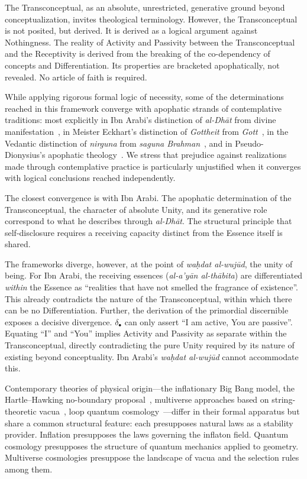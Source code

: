 \documentclass[11pt, a4paper]{article}
\theoremstyle{formalism}
\begin{document}
The Transconceptual, as an absolute, unrestricted, generative ground beyond
conceptualization, invites theological terminology. However, the
Transconceptual is not posited, but derived. It is derived as a logical
argument against Nothingness. The reality of Activity and Passivity between the
Transconceptual and the Receptivity is derived from the breaking of the
co-dependency of concepts and Differentiation. Its properties are bracketed
apophatically, not revealed. No article of faith is required.

While applying rigorous formal logic of necessity, some of the determinations
reached in this framework converge with apophatic strands of
contemplative traditions: most explicitly in Ibn Arabi's distinction of
\textit{al-Dh\=at} from divine manifestation~\cite{IbnArabi1203}, in Meister
Eckhart's distinction of \textit{Gottheit} from
\textit{Gott}~\cite{Eckhart1300}, in the Vedantic distinction of
\textit{nirguna} from \textit{saguna Brahman}~\cite{Shankara800}, and in
Pseudo-Dionysius's apophatic theology~\cite{PseudoDionysius500}. We stress that
prejudice against realizations made through contemplative practice is
particularly unjustified when it converges with logical conclusions reached
independently.

The closest convergence is with Ibn Arabi. The apophatic determination of the
Transconceptual, the character of absolute Unity, and its generative role
correspond to what he describes through \textit{al-Dh\=at}. The structural
principle that self-disclosure requires a receiving capacity distinct from
the Essence itself is shared.

The frameworks diverge, however, at the point of \textit{wa\d{h}dat
al-wuj\=ud}, the unity of being. For Ibn Arabi, the receiving essences
(\textit{al-a'y\=an al-th\=abita}) are differentiated \textit{within} the
Essence as ``realities that have not smelled the fragrance of existence''.
This already contradicts the nature of the Transconceptual, within which
there can be no Differentiation. Further, the derivation of the primordial
discernible exposes a decisive divergence. $\delta_\bullet$ can only assert
``I am active, You are passive''. Equating ``I'' and ``You'' implies Activity
and Passivity as separate within the Transconceptual, directly contradicting
the pure Unity required by its nature of existing beyond conceptuality. Ibn
Arabi's \textit{wa\d{h}dat al-wuj\=ud} cannot accommodate this.

Contemporary theories of physical origin---the inflationary Big Bang model, the
Hartle--Hawking no-boundary proposal~\cite{HartleHawking1983}, multiverse
approaches based on string-theoretic vacua~\cite{Susskind2003}, loop quantum
cosmology~\cite{Bojowald2008}---differ in their formal apparatus but share a
common structural feature: each presupposes natural laws as a stability
provider. Inflation presupposes the laws governing the inflaton field. Quantum
cosmology presupposes the structure of quantum mechanics applied to geometry.
Multiverse cosmologies presuppose the landscape of vacua and the selection
rules among them.
\end{document}

